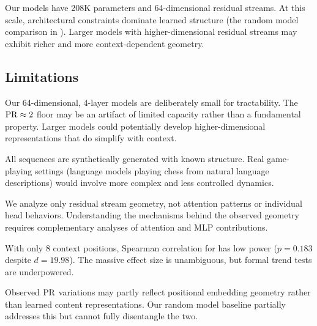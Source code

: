Our models have 208K parameters and 64-dimensional residual streams. At this scale, architectural constraints dominate learned structure (\cf the random model comparison in ). Larger models with higher-dimensional residual streams may exhibit richer and more context-dependent geometry.

\subsection{Limitations}
\label{sec:limitations}

Our 64-dimensional, 4-layer models are deliberately small for tractability. The $\mathrm{PR} \approx 2$ floor may be an artifact of limited capacity rather than a fundamental property. Larger models could potentially develop higher-dimensional representations that do simplify with context.

All sequences are synthetically generated with known structure. Real game-playing settings (\eg language models playing chess from natural language descriptions) would involve more complex and less controlled dynamics.

We analyze only residual stream geometry, not attention patterns or individual head behaviors. Understanding the mechanisms behind the observed geometry requires complementary analyses of attention and MLP contributions.

With only 8 context positions, Spearman correlation for \ttt has low power ($p = 0.183$ despite $d = 19.98$). The massive effect size is unambiguous, but formal trend tests are underpowered.

Observed $\mathrm{PR}$ variations may partly reflect positional embedding geometry rather than learned content representations. Our random model baseline partially addresses this but cannot fully disentangle the two.
